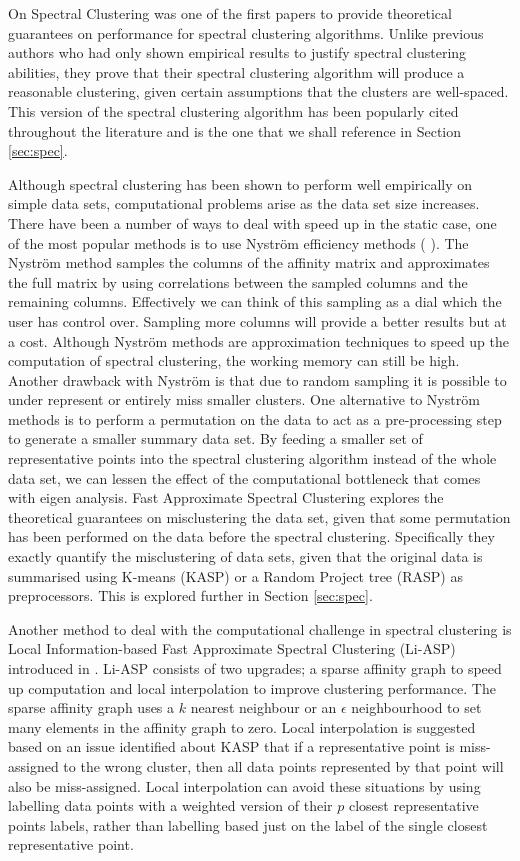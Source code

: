 On Spectral Clustering \cite{Ng2001} was one of the first papers to provide theoretical guarantees on performance for spectral clustering algorithms.  Unlike previous authors who had only shown empirical results to justify spectral clustering abilities, they prove that their spectral clustering algorithm will produce a reasonable clustering, given certain assumptions that the clusters are well-spaced. This version of the spectral clustering algorithm has been popularly cited throughout the literature and is the one that we shall reference in Section \ref{sec:spec}. 

Although spectral clustering has been shown to perform well empirically on simple data sets, computational problems arise as the data set size increases. There have been a number of ways to deal with speed up in the static case, one of the most popular methods is to use Nystr\"{o}m efficiency methods ( \cite{Williams2001, Fowlkes2004}). The Nystr\"{o}m method samples the columns of the affinity matrix and approximates the full matrix by using correlations between the sampled columns and the remaining columns. Effectively we can think of this sampling as a dial which the user has control over. Sampling more columns will provide a better results but at a cost. Although Nystr\"{o}m methods are approximation techniques to speed up the computation of spectral clustering, the working memory can still be high. Another drawback with Nystr\"{o}m is that due to random sampling it is possible to under represent or entirely miss smaller clusters.  
One alternative to Nystr\"{o}m methods is to perform a permutation on the data to act as a pre-processing step to generate a smaller summary data set. By feeding a smaller set of representative points into the spectral clustering algorithm instead of the whole data set, we can lessen the effect of the computational bottleneck that comes with eigen analysis. Fast Approximate Spectral Clustering \cite{Yan2009}  explores the theoretical guarantees on misclustering the data set, given that some permutation has been performed on the data before the spectral clustering. Specifically they exactly quantify the misclustering of data sets, given that the original data is summarised using K-means (KASP) or a Random Project tree (RASP) as preprocessors. This is explored further in Section \ref{sec:spec}.

Another method to deal with the computational challenge in spectral clustering is Local Information-based Fast Approximate Spectral Clustering (Li-ASP) introduced in \cite{Cao2014}. Li-ASP consists of two upgrades; a sparse affinity graph to speed up computation and local interpolation to improve clustering performance. The sparse affinity graph uses a $k$ nearest neighbour or an $\epsilon$ neighbourhood to set many elements in the affinity graph to zero. Local interpolation is suggested based on an issue identified about KASP \cite{Yan2009} that if a representative point is miss-assigned to the wrong cluster, then all data points represented by that point will also be miss-assigned. Local interpolation can avoid these situations by using labelling data points with a weighted version of their $p$ closest representative points labels, rather than labelling based just on the label of the single closest representative point. 

